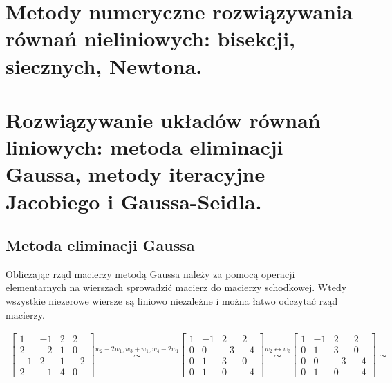 \documentclass[12pt]{article}
\begin{document}
    \newpage

    \section{Metody numeryczne rozwiązywania równań nieliniowych: bisekcji, siecznych, Newtona.}

    \newpage

    \section{Rozwiązywanie układów równań liniowych: metoda eliminacji Gaussa, metody iteracyjne Jacobiego i Gaussa-Seidla.}

    \subsection{Metoda eliminacji Gaussa}

    Obliczając rząd macierzy metodą Gaussa należy za pomocą operacji elementarnych na wierszach sprowadzić macierz do
    macierzy schodkowej. Wtedy wszystkie niezerowe wiersze są liniowo niezależne i można łatwo odczytać rząd macierzy.

    \begin{align*}
        \begin{bmatrix}
            1 & -1 & 2 & 2\\
            2 & -2 & 1 & 0\\
            -1 & 2 & 1 & -2\\
            2 & -1 & 4 & 0
        \end{bmatrix}
        \stackrel{w_2 - 2w_1, w_3 + w_1, w_4 - 2w_1}{\sim}
        \begin{bmatrix}
            1 & -1 & 2 & 2\\
            0 & 0 & -3 & -4\\
            0 & 1 & 3 & 0\\
            0 & 1 & 0 & -4
        \end{bmatrix}
        \stackrel{w_2 \leftrightarrow w_3}{\sim}
        \begin{bmatrix}
            1 & -1 & 2 & 2\\
            0 & 1 & 3 & 0\\
            0 & 0 & -3 & -4\\
            0 & 1 & 0 & -4
        \end{bmatrix}
        \sim
    \end{align*}
\end{document}
